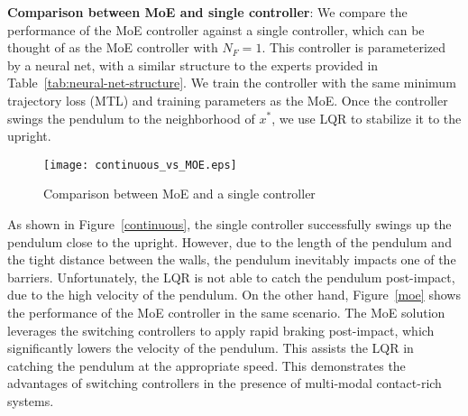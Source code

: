 %

%
\textbf{Comparison between MoE and single controller}: We compare the
performance of the MoE controller against a single controller, which can be
thought of as the MoE controller with $N_F=1$.
%
This controller is parameterized by a neural net, with a similar structure to
the experts provided in Table~\ref{tab:neural-net-structure}.
%
We train the controller with the same minimum trajectory loss (MTL) and training
parameters as the MoE.
%
Once the controller swings the pendulum to the neighborhood of $x^*$, we use LQR
to stabilize it to the upright.

\begin{figure}[tb]
    \centering
    \texttt{[image: continuous\_vs\_MOE.eps]}
    \caption{Comparison between MoE and a single controller}
    \label{fig:contandmoe}
\end{figure}
%
As shown in Figure~\ref{continuous}, the single controller
successfully swings up the pendulum close to the upright.
%
However, due to the length of the pendulum and the tight distance between the
walls, the pendulum inevitably impacts one of the barriers. 
%
Unfortunately, the LQR is not able to catch the pendulum post-impact, due to the
high velocity of the pendulum.
%
On the other hand, Figure~\ref{moe} shows the performance of the MoE
controller in the same scenario.
%
The MoE solution leverages the switching controllers to apply rapid braking
post-impact, which significantly lowers the velocity of the pendulum. 
%
This assists the LQR in catching the pendulum at the appropriate speed.
%
This demonstrates the advantages of switching controllers in the presence of
multi-modal contact-rich systems.
